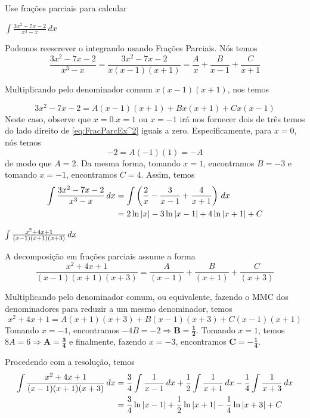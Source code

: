\cleardoublepage\documentclass[../main.tex]{subfiles}
\begin{document}
\begin{ex}~\label{FracParc3FatLineares}
\\ Use frações parciais para calcular
\begin{compactenum}[a)]
\item \(\int \frac{3x^2-7x-2}{x^3-x}\, dx\)
\begin{sol}
Podemos reescrever o integrando usando Frações Parciais. Nós temos
\[\frac{3x^2-7x-2}{x^3-x}=\frac{3x^2-7x-2}{x(x-1)(x+1)}=\frac{A}{x}+\frac{B}{x-1}+\frac{C}{x+1}\]

Multiplicando pelo denominador comum $x(x-1)(x+1)$, nos temos

\begin{equation}
3x^2-7x-2=A(x-1)(x+1)+Bx(x+1)+Cx(x-1)\label{eq:FracParcEx^2}
\end{equation}
Neste caso, observe que $x=0. x=1$ ou $x=-1$ irá nos fornecer dois de três temos do lado direito de  \ref{eq:FracParcEx^2} iguais a zero. Especificamente, para $x=0$, nós temos
\begin{equation*}
- 2 = A ( -1)(1) = -A 
\end{equation*}
de modo que \(A = 2\). Da mesma forma, tomando \(x = 1\), encontramos \(B = -3\) e tomando \(x = -1\), encontramos
\(C = 4\). Assim, temos
\begin{align*}
\int \frac{3x^2-7x-2}{x^3-x}\, dx&=\int \left(\frac{2}{x}-\frac{3}{x-1}+\frac{4}{x+1}\right)\, dx\\
&=2\ln |x|-3\ln |x-1|+4\ln |x+1|+C
\end{align*}
\end{sol}
\item $\int \frac{x^2+4x+1}{(x-1)(x+1)(x+3)} \, dx$

\begin{sol}
 A decomposição em frações parciais assume a forma
$$\frac{x^2+4x+1}{(x-1)(x+1)(x+3)}=\frac{A}{(x-1)}+\frac{B}{(x+1)}+\frac{C}{(x+3)}$$

Multiplicando pelo denominador comum, ou equivalente, fazendo o MMC dos denominadores para reduzir a um mesmo denominador, temos 
$$x^2 + 4x + 1 = A(x + 1)(x + 3) + B(x - 1)(x + 3) + C(x - 1)(x + 1)$$
Tomando $x=-1$, encontramos $-4B=-2\Rightarrow \boldsymbol{B=\frac{1}{2}}$. Tomando $x=1$, temos $8A=6\Rightarrow \boldsymbol{A=\frac{3}{4}}$ e finalmente, fazendo $x=-3$, encontramos $\boldsymbol{C=-\frac{1}{4}}$.

Procedendo com a resolução, temos
\begin{align*}
    \int \frac{x^2+4x+1}{(x-1)(x+1)(x+3)} \, dx&
    =\frac{3}{4}\int \frac{1}{x-1} \, dx+\frac{1}{2}\int \frac{1}{x+1} \, dx-\frac{1}{4}\int \frac{1}{x+3} \, dx\\
    &=\frac{3}{4}\ln|x-1|+\frac{1}{2}\ln|x+1|-\frac{1}{4}\ln|x+3|+C
        \end{align*}

\end{sol}
\end{compactenum}
\end{ex}
\end{document}
